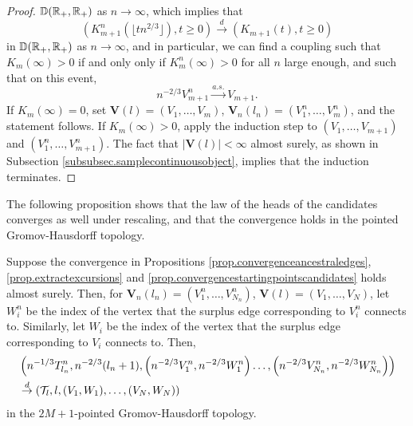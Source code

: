 \begin{proof}
${\mathbb D}({\mathbb R}_+,{\mathbb R}_+)$ as $n\to\infty$, which implies that 
$$(K^n_{m+1}(\lfloor t n^{2/3} \rfloor ),t\geq 0)\overset{d}{\to} (K_{m+1}(t),t\geq 0)$$ in ${\mathbb D}({\mathbb R}_+,{\mathbb R}_+)$ as $n\to\infty$, and in particular, we can find a coupling such that $K_m(\infty)>0$ if and only only if $K^n_m(\infty)>0$ for all $n$ large enough, and such that on this event,
$$n^{-2/3}V_{m+1}^n\overset{a.s.}{\to}V_{m+1}.$$
If $K_m(\infty)=0$, set $\mathbf{V}(l)=(V_1,\dots,V_m)$, $\mathbf{V}_n(l_n)=(V^n_1,\dots,V^n_m)$, and the statement follows. If $K_m(\infty)>0$, apply the induction step to $(V_1,\dots,V_{m+1})$ and $(V^n_1,\dots,V^n_{m+1})$. The fact that $|\mathbf{V}(l)|<\infty$ almost surely, as shown in Subsection \ref{subsubsec.samplecontinuousobject}, implies that the induction terminates.
\end{proof}

The following proposition shows that the law of the heads of the candidates converges as well under rescaling, and that the convergence holds in the pointed Gromov-Hausdorff topology. 
\begin{proposition}\label{prop.convergenceheadscandidates}
Suppose the convergence in Propositions \ref{prop.convergenceancestraledges}, \ref{prop.extractexcursions} and \ref{prop.convergencestartingpointscandidates} holds almost surely. Then, for $\mathbf{V}_n(l_n)=(V^n_1,\dots, V^n_{N_n})$, $\mathbf{V}(l)=(V_1,\dots, V_{N})$, let $W^n_i$ be the index of the vertex that the surplus edge corresponding to $V^n_i$ connects to. Similarly, let $W_i$ be the index of the vertex that the surplus edge corresponding to $V_i$ connects to. Then, 
\begin{align*}&\left(n^{-1/3}T^n_{l_n}, n^{-2/3}(l_n+1), \left(n^{-2/3}V^n_1,n^{-2/3}W^n_1\right) \dots, \left(n^{-2/3}V^n_{N_n}, n^{-2/3}W^n_{N_n}\right)\right)\\
&\overset{d}{\to}\left(\cT_l, l, (V_1,W_1),\dots, (V_{N},W_{N})\right)\end{align*}
in the $2M+1$-pointed Gromov-Hausdorff topology. 
\end{proposition}

